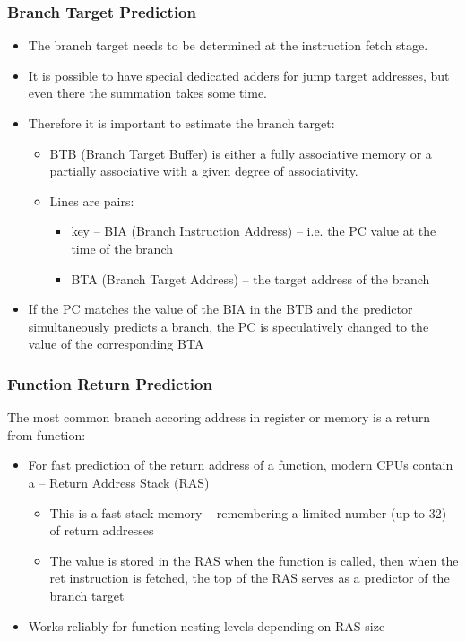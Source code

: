 \documentclass{beamer}
\begin{document}
\begin{frame}
\frametitle{Branch Target Prediction}

\begin{itemize}
\item The branch target needs to be determined at the instruction fetch stage.
\item It is possible to have special dedicated adders for jump target addresses, but even there the summation takes some time.
\item Therefore it is important to estimate the branch target:
\begin{itemize}
\item BTB (Branch Target Buffer) is either a fully associative memory or a partially
associative with a given degree of associativity.
\item Lines are pairs:
\begin{itemize}
\item key -- BIA (Branch Instruction Address) -- i.e. the PC value at the time of the branch
\item BTA (Branch Target Address) -- the target address of the branch
\end{itemize}
\end{itemize}
\item If the PC matches the value of the BIA in the BTB and the predictor simultaneously predicts a branch, the PC is speculatively changed to the value of the corresponding BTA
\end{itemize}
\end{frame}

\begin{frame}
\frametitle{Function Return Prediction}

The most common branch accoring address in register or memory is a return from function:
\begin{itemize}
\item For fast prediction of the return address of a function, modern CPUs contain a -- Return Address Stack (RAS)
\begin{itemize}
\item This is a fast stack memory -- remembering a limited number (up to 32) of return addresses
\item The value is stored in the RAS when the function is called, then when the ret instruction is fetched, the top of the RAS serves as a predictor of the branch target
\end{itemize}
\item Works reliably for function nesting levels depending on RAS size
\end{itemize}
\end{frame}
\end{document}
